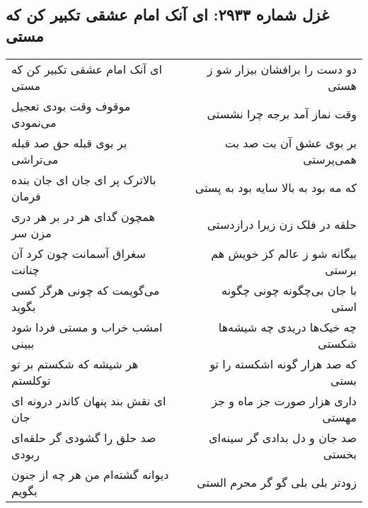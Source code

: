 \begin{center}
\section*{غزل شماره ۲۹۳۳: ای آنک امام عشقی تکبیر کن که مستی}
\label{sec:2933}
\begin{longtable}{l p{0.5cm} r}
ای آنک امام عشقی تکبیر کن که مستی
&&
دو دست را برافشان بیزار شو ز هستی
\\
موقوف وقت بودی تعجیل می‌نمودی
&&
وقت نماز آمد برجه چرا نشستی
\\
بر بوی قبله حق صد قبله می‌تراشی
&&
بر بوی عشق آن بت صد بت همی‌پرستی
\\
بالاترک پر ای جان ای جان بنده فرمان
&&
که مه بود به بالا سایه بود به پستی
\\
همچون گدای هر در بر هر دری مزن سر
&&
حلقه در فلک زن زیرا درازدستی
\\
سغراق آسمانت چون کرد آن چنانت
&&
بیگانه شو ز عالم کز خویش هم برستی
\\
می‌گویمت که چونی هرگز کسی بگوید
&&
با جان بی‌چگونه چونی چگونه استی
\\
امشب خراب و مستی فردا شود ببینی
&&
چه خیک‌ها دریدی چه شیشه‌ها شکستی
\\
هر شیشه که شکستم بر تو توکلستم
&&
که صد هزار گونه اشکسته را تو بستی
\\
ای نقش بند پنهان کاندر درونه ای جان
&&
داری هزار صورت جز ماه و جز مهستی
\\
صد حلق را گشودی گر حلقه‌ای ربودی
&&
صد جان و دل بدادی گر سینه‌ای بخستی
\\
دیوانه گشته‌ام من هر چه از جنون بگویم
&&
زودتر بلی بلی گو گر محرم الستی
\\
\end{longtable}
\end{center}

